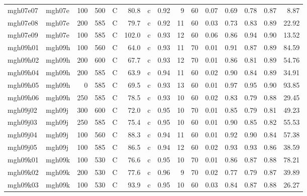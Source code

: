 \documentclass{article}
\begin{document}
\begin{landscape}
\begin{longtable}{llrrlrlrrrrrrrr}
    mgh07e07 &     mgh07e &  100 &  500 &     C &    80.8 &   c &  0.92 &   9 &         60 &  0.07 &  0.69 &  0.78 &  0.87 &    8.87 \\
    mgh07e08 &     mgh07e &  200 &  585 &     C &    79.7 &   c &  0.92 &  11 &         60 &  0.03 &  0.73 &  0.83 &  0.89 &   22.92 \\
    mgh07e09 &     mgh07e &  100 &  585 &     C &   102.0 &   c &  0.93 &  12 &         60 &  0.06 &  0.86 &  0.94 &  0.90 &   13.52 \\
    mgh09h01 &     mgh09h &  100 &  560 &     C &    64.0 &   c &  0.93 &  11 &         70 &  0.01 &  0.91 &  0.87 &  0.89 &   84.59 \\
    mgh09h02 &     mgh09h &  200 &  600 &     C &    67.7 &   c &  0.93 &  12 &         70 &  0.01 &  0.86 &  0.81 &  0.89 &   54.76 \\
    mgh09h04 &     mgh09h &  200 &  585 &     C &    63.9 &   c &  0.94 &  11 &         60 &  0.02 &  0.90 &  0.84 &  0.89 &   34.91 \\
    mgh09h05 &     mgh09h &    0 &  585 &     C &    69.5 &   c &  0.93 &  13 &         60 &  0.01 &  0.97 &  0.95 &  0.90 &   93.85 \\
    mgh09h06 &     mgh09h &  250 &  585 &     C &    78.5 &   c &  0.93 &  10 &         60 &  0.02 &  0.83 &  0.79 &  0.88 &   29.45 \\
    mgh09j02 &     mgh09j &  300 &  600 &     C &    72.0 &   c &  0.95 &  10 &         70 &  0.01 &  0.85 &  0.79 &  0.81 &   49.23 \\
    mgh09j03 &     mgh09j &  250 &  585 &     C &    75.4 &   c &  0.95 &  10 &         60 &  0.01 &  0.90 &  0.85 &  0.82 &   55.53 \\
    mgh09j04 &     mgh09j &  100 &  560 &     C &    88.3 &   c &  0.94 &  11 &         60 &  0.01 &  0.92 &  0.90 &  0.84 &   57.38 \\
    mgh09j05 &     mgh09j &  100 &  585 &     C &    86.5 &   c &  0.94 &  12 &         60 &  0.02 &  0.93 &  0.93 &  0.86 &   38.59 \\
    mgh09k01 &     mgh09k &  100 &  530 &     C &    76.6 &   c &  0.95 &  10 &         70 &  0.01 &  0.86 &  0.87 &  0.88 &   78.21 \\
    mgh09k02 &     mgh09k &  200 &  530 &     C &    77.6 &   c &  0.96 &   9 &         70 &  0.02 &  0.77 &  0.79 &  0.87 &   39.89 \\
    mgh09k03 &     mgh09k &  100 &  530 &     C &    93.9 &   c &  0.95 &  10 &         60 &  0.03 &  0.84 &  0.87 &  0.88 &   26.27 \\

\end{longtable}
\end{landscape}
\end{document}
